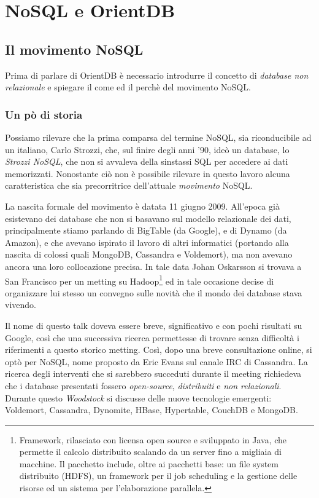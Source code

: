 \chapter{NoSQL e OrientDB}

\section{Il movimento NoSQL}
Prima di parlare di OrientDB è necessario introdurre il concetto di \emph{database non relazionale} e spiegare il come ed il perchè del movimento NoSQL.

\subsection{Un pò di storia}
Possiamo rilevare che la prima comparsa del termine NoSQL, sia riconducibile ad un italiano, Carlo Strozzi, che, sul finire degli anni '90, ideò un database, lo \emph{Strozzi NoSQL}, che non si avvaleva della sinstassi SQL per accedere ai dati memorizzati. Nonostante ciò non è possibile rilevare in questo lavoro alcuna caratteristica che sia precorritrice dell'attuale \emph{movimento} NoSQL.

La nascita formale del movimento è datata 11 giugno 2009. All'epoca già esistevano dei database che non si basavano sul modello relazionale dei dati, principalmente stiamo parlando di BigTable (da Google), e di Dynamo (da Amazon), e che avevano ispirato il lavoro di altri informatici (portando alla nascita di colossi quali MongoDB, Cassandra e Voldemort), ma non avevano ancora una loro collocazione precisa. 
In tale data Johan Oskarsson si trovava a San Francisco per un metting su 
Hadoop\footnote{Framework, rilasciato con licensa open source e sviluppato in Java, che permette il calcolo distribuito scalando da un server fino a migliaia di macchine. Il pacchetto include, oltre ai pacchetti base: un file system distribuito (HDFS), un framework per il job scheduling e la gestione delle risorse ed un sistema per l'elaborazione parallela.} 
ed in tale occasione decise di organizzare lui stesso un convegno sulle novità che il mondo dei database stava vivendo.

Il nome di questo talk doveva essere breve, significativo e con pochi risultati su Google, così che una successiva ricerca permettesse di trovare senza difficoltà i riferimenti a questo storico metting. Così, dopo una breve consultazione online, si optò per NoSQL, nome proposto da Eric Evans sul canale IRC di Cassandra. La ricerca degli interventi che si sarebbero succeduti durante il meeting richiedeva che i database presentati fossero \emph{open-source}, \emph{distribuiti} e \emph{non relazionali}. Durante questo \emph{Woodstock} si discusse delle nuove tecnologie emergenti: Voldemort, Cassandra, Dynomite, HBase, Hypertable, CouchDB e MongoDB.  

